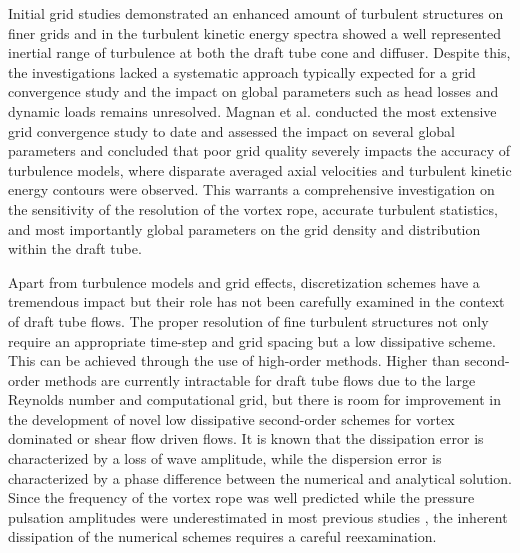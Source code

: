 Initial grid studies \cite{stein2006numerical, krappel2014investigation} demonstrated an enhanced amount of turbulent structures on finer grids and in \cite{krappel2014investigation} the turbulent kinetic energy spectra showed a well represented inertial range of turbulence at both the draft tube cone and diffuser. Despite this, the investigations lacked a systematic approach typically expected for a grid convergence study and the impact on global parameters such as head losses and dynamic loads remains unresolved. Magnan et al. \cite{magnan2014challenges} conducted the most extensive grid convergence study to date and assessed the impact on several global parameters and concluded that poor grid quality severely impacts the accuracy of turbulence models, where disparate averaged axial velocities and turbulent kinetic energy contours were observed. This warrants a comprehensive investigation on the sensitivity of the resolution of the vortex rope, accurate turbulent statistics, and most importantly global parameters on the grid density and distribution within the draft tube. 


Apart from turbulence models and grid effects, discretization schemes have a tremendous impact but their role has not been carefully examined in the context of draft tube flows. The proper resolution of fine turbulent structures not only require an appropriate time-step and grid spacing but a low dissipative scheme. This can be achieved through the use of high-order methods. Higher than second-order methods are currently intractable for draft tube flows due to the large Reynolds number and computational grid, but there is room for improvement in the development of novel low dissipative second-order schemes for vortex dominated or shear flow driven flows. It is known that the dissipation error is characterized by a loss of wave amplitude, while the dispersion error is characterized by a phase difference between the numerical and analytical solution. Since the frequency of the vortex rope was well predicted while the pressure pulsation amplitudes were underestimated in most previous studies \cite{sick2002cfd, ruprecht2002simulation, stein2006numerical, jovst2009numerical}, the inherent dissipation of the numerical schemes requires a careful reexamination.


